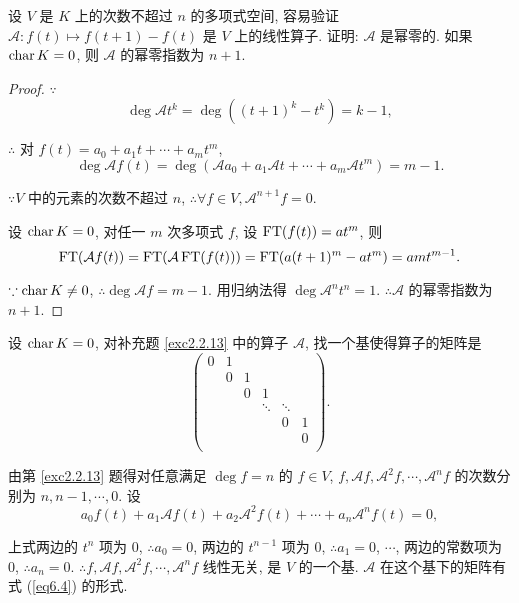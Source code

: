 \documentclass[color=black,device=normal,lang=cn,mode=geye]{elegantnote}
\begin{document}
\begin{exercisec}[2.2.13(2)]\label{exc2.2.13}
    设 $V$ 是 $K$ 上的次数不超过 $n$ 的多项式空间, 容易验证 $\mathcal{A}:f(t)\mapsto f(t+1)-f(t)$ 是 $V$ 上的线性算子. 证明: $\mathcal{A}$ 是幂零的. 如果 $\operatorname{char} K=0$, 则 $\mathcal{A}$ 的幂零指数为 $n+1$.
\end{exercisec}
\begin{proof}
    $\because$
    \[\deg\mathcal{A}t^k=\deg((t+1)^k-t^k)=k-1,\]

    $\therefore$ 对 $f(t)=a_0+a_1t+\cdots+a_mt^m$,
    \[\deg\mathcal{A}f(t)=\deg(\mathcal{A}a_0+a_1\mathcal{A}t+\cdots+a_m\mathcal{A}t^m)=m-1.\]

    $\because V$ 中的元素的次数不超过 $n$, $\therefore\forall f\in V,\mathcal{A}^{n+1}f=0$.

    设 $\operatorname{char} K=0$, 对任一 $m$ 次多项式 $f$, 设 $\operatorname{FT}(f(t))=at^m$, 则
    \[\operatorname{FT}(\mathcal{A}f(t))=\operatorname{FT}(\mathcal{A}\operatorname{FT}(f(t)))=\operatorname{FT}(a(t+1)^m-at^m)=amt^{m-1}.\]

    $\because\operatorname{char} K\neq0$, $\therefore\deg\mathcal{A}f=m-1$. 用归纳法得 $\deg\mathcal{A}^nt^n=1$. $\therefore\mathcal{A}$ 的幂零指数为 $n+1$.
\end{proof}
\begin{exercise}[2.2.14]
    设 $\operatorname{char} K=0$, 对补充题 \ref{exc2.2.13} 中的算子 $\mathcal{A}$, 找一个基使得算子的矩阵是
    \begin{equation}\label{eq6.4}
        \begin{pmatrix}
            0 & 1 \\
            & 0 & 1 \\
            && 0 & 1 \\
            &&& \ddots & \ddots \\
            &&&& 0 & 1 \\
            &&&&& 0 \\
        \end{pmatrix}.
    \end{equation}
\end{exercise}
\begin{solution}
    由第 \ref{exc2.2.13} 题得对任意满足 $\deg f=n$ 的 $f\in V$, $f,\mathcal{A}f,\mathcal{A}^2f,\cdots,\mathcal{A}^nf$ 的次数分别为 $n,n-1,\cdots,0$. 设
    \[a_0f(t)+a_1\mathcal{A}f(t)+a_2\mathcal{A}^2f(t)+\cdots+a_n\mathcal{A}^nf(t)=0,\]

    上式两边的 $t^n$ 项为 $0$, $\therefore a_0=0$, 两边的 $t^{n-1}$ 项为 $0$, $\therefore a_1=0$, $\cdots$, 两边的常数项为 $0$, $\therefore a_n=0$. $\therefore f,\mathcal{A}f,\mathcal{A}^2f,\cdots,\mathcal{A}^nf$ 线性无关, 是 $V$ 的一个基. $\mathcal{A}$ 在这个基下的矩阵有式 (\ref{eq6.4}) 的形式.
\end{solution}
\end{document}
